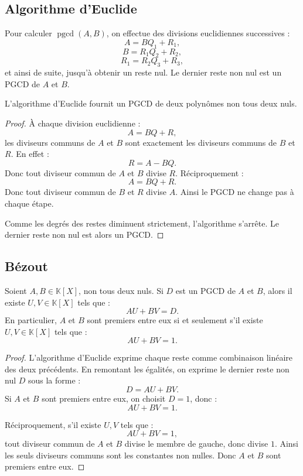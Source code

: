 \documentclass[11pt,a4paper]{article}
\newcommand{\K}{\mathbb K}
\newcommand{\pgcd}{\operatorname{pgcd}}
\begin{document}
\subsection{Algorithme d'Euclide}

\begin{methodbox}
Pour calculer \(\pgcd(A,B)\), on effectue des divisions euclidiennes successives :
\[
A=BQ_1+R_1,
\]
\[
B=R_1Q_2+R_2,
\]
\[
R_1=R_2Q_3+R_3,
\]
et ainsi de suite, jusqu'à obtenir un reste nul.  
Le dernier reste non nul est un PGCD de \(A\) et \(B\).
\end{methodbox}

\begin{theorembox}
L'algorithme d'Euclide fournit un PGCD de deux polynômes non tous deux nuls.
\end{theorembox}

\begin{proof}
À chaque division euclidienne :
\[
A=BQ+R,
\]
les diviseurs communs de \(A\) et \(B\) sont exactement les diviseurs communs de \(B\) et \(R\).  
En effet :
\[
R=A-BQ.
\]
Donc tout diviseur commun de \(A\) et \(B\) divise \(R\).  
Réciproquement :
\[
A=BQ+R.
\]
Donc tout diviseur commun de \(B\) et \(R\) divise \(A\).  
Ainsi le PGCD ne change pas à chaque étape.

Comme les degrés des restes diminuent strictement, l'algorithme s'arrête.  
Le dernier reste non nul est alors un PGCD.
\end{proof}

\subsection{Bézout}

\begin{theorembox}
Soient \(A,B\in\K[X]\), non tous deux nuls.  
Si \(D\) est un PGCD de \(A\) et \(B\), alors il existe \(U,V\in\K[X]\) tels que :
\[
AU+BV=D.
\]
En particulier, \(A\) et \(B\) sont premiers entre eux si et seulement s'il existe \(U,V\in\K[X]\) tels que :
\[
AU+BV=1.
\]
\end{theorembox}

\begin{proof}
L'algorithme d'Euclide exprime chaque reste comme combinaison linéaire des deux précédents.  
En remontant les égalités, on exprime le dernier reste non nul \(D\) sous la forme :
\[
D=AU+BV.
\]
Si \(A\) et \(B\) sont premiers entre eux, on choisit \(D=1\), donc :
\[
AU+BV=1.
\]

Réciproquement, s'il existe \(U,V\) tels que :
\[
AU+BV=1,
\]
tout diviseur commun de \(A\) et \(B\) divise le membre de gauche, donc divise \(1\).  
Ainsi les seuls diviseurs communs sont les constantes non nulles.  
Donc \(A\) et \(B\) sont premiers entre eux.
\end{proof}
\end{document}
